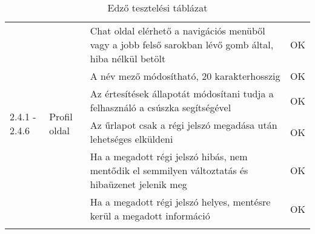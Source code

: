 \begin{center}
\begin{longtable}{ | p{} | p{} | p{} | p{} | }
			\multirow{6}{=}{2.4.1 - 2.4.6} 
			& \multirow{6}{=}{Profil oldal}
			& Chat oldal elérhető a navigációs menüből vagy a jobb felső sarokban lévő gomb által, hiba nélkül betölt
			& OK \\
			\cline{3-4}
			& & A név mező módosítható, 20 karakterhosszig
			& OK \\
			\cline{3-4}
			& & Az értesítések állapotát módosítani tudja a felhasználó a csúszka segítségével
			& OK \\
			\cline{3-4}
			& & Az űrlapot csak a régi jelszó megadása után lehetséges elküldeni
			& OK \\
			\cline{3-4}
			& & Ha a megadott régi jelszó hibás, nem mentődik el semmilyen változtatás és hibaüzenet jelenik meg
			& OK \\
			\cline{3-4}
			& & Ha a megadott régi jelszó helyes, mentésre kerül a megadott információ
			& OK \\
			\hline

			\caption{Edző tesztelési táblázat}
			\label{tab:testedzo}       
	\end{longtable}
\end{center}




